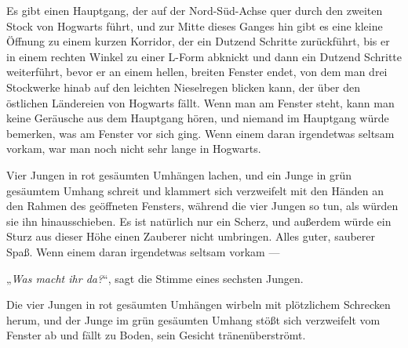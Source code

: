 Es gibt einen Hauptgang, der auf der Nord-Süd-Achse quer durch den zweiten Stock von Hogwarts führt, und zur Mitte dieses Ganges hin gibt es eine kleine Öffnung zu einem kurzen Korridor, der ein Dutzend Schritte zurückführt, bis er in einem rechten Winkel zu einer L-Form abknickt und dann ein Dutzend Schritte weiterführt, bevor er an einem hellen, breiten Fenster endet, von dem man drei Stockwerke hinab auf den leichten Nieselregen blicken kann, der über den östlichen Ländereien von Hogwarts fällt. Wenn man am Fenster steht, kann man keine Geräusche aus dem Hauptgang hören, und niemand im Hauptgang würde bemerken, was am Fenster vor sich ging. Wenn einem daran irgendetwas seltsam vorkam, war man noch nicht sehr lange in Hogwarts.

Vier Jungen in rot gesäumten Umhängen lachen, und ein Junge in grün gesäumtem Umhang schreit und klammert sich verzweifelt mit den Händen an den Rahmen des geöffneten Fensters, während die vier Jungen so tun, als würden sie ihn hinausschieben. Es ist natürlich nur ein Scherz, und außerdem würde ein Sturz aus dieser Höhe einen Zauberer nicht umbringen. Alles guter, sauberer Spaß. Wenn einem daran irgendetwas seltsam vorkam —

„\emph{Was macht ihr da?}“, sagt die Stimme eines sechsten Jungen.

Die vier Jungen in rot gesäumten Umhängen wirbeln mit plötzlichem Schrecken herum, und der Junge im grün gesäumten Umhang stößt sich verzweifelt vom Fenster ab und fällt zu Boden, sein Gesicht tränenüberströmt.

